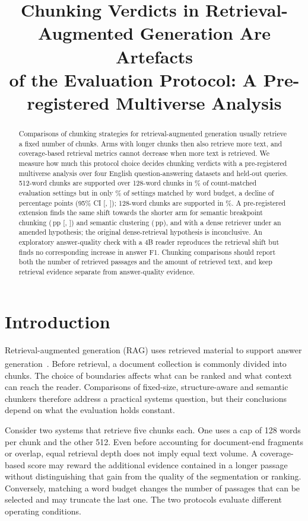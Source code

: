 \documentclass[11pt]{article}
\title{Chunking Verdicts in Retrieval-Augmented Generation Are Artefacts\texorpdfstring{\\}{ }of the Evaluation
Protocol: A Pre-registered Multiverse Analysis}
\author{\AuthorName}
\date{}
\newcommand{\pp}{\ensuremath{\,\mathrm{pp}}}
\newcommand{\citeL}[1]{\cite{#1}\textsuperscript{\textcolor{red}{\dag}}}
\begin{document}
\maketitle

\begin{abstract}
Comparisons of chunking strategies for retrieval-augmented generation usually retrieve a fixed number of chunks. Arms
with longer chunks then also retrieve more text, and coverage-based retrieval metrics cannot decrease when more text
is retrieved. We measure how much this protocol choice decides chunking verdicts with a pre-registered multiverse
analysis over four English question-answering datasets and \EoneNq{} held-out queries. 512-word chunks are supported
over 128-word chunks in \PoneCountFiveTwelve\% of \PoneUniversesCount{} count-matched evaluation settings but in only
\PoneBudgetFiveTwelve\% of \PoneUniversesBudget{} settings matched by word budget, a decline of \HOneEst{} percentage
points (95\% CI [\HOneLo, \HOneHi]); 128-word chunks are supported in \PoneBudgetOneTwoEight\%. A pre-registered
extension finds the same shift towards the shorter arm for semantic breakpoint chunking (\HFourEst\pp{}
[\HFourLo, \HFourHi]) and semantic clustering (\HFourBEst\pp), and with a dense retriever under an amended hypothesis;
the original dense-retrieval hypothesis is inconclusive. An exploratory answer-quality check with a 4B reader
reproduces the retrieval shift but finds no corresponding increase in answer F1. Chunking comparisons should report
both the number of retrieved passages and the amount of retrieved text, and keep retrieval evidence separate from
answer-quality evidence.
\end{abstract}

\section{Introduction}
Retrieval-augmented generation (RAG) uses retrieved material to support answer generation~\citeL{lewis2020rag,gao2023ragsurvey}.
Before retrieval, a document collection is commonly divided into chunks. The choice of boundaries affects what can be
ranked and what context can reach the reader. Comparisons of fixed-size, structure-aware and semantic chunkers
therefore address a practical systems question, but their conclusions depend on what the evaluation holds constant.

Consider two systems that retrieve five chunks each. One uses a cap of 128 words per chunk and the other 512. Even
before accounting for document-end fragments or overlap, equal retrieval depth does not imply equal text volume. A
coverage-based score may reward the additional evidence contained in a longer passage without distinguishing that
gain from the quality of the segmentation or ranking. Conversely, matching a word budget changes the number of
passages that can be selected and may truncate the last one. The two protocols evaluate different operating
conditions.
\end{document}

